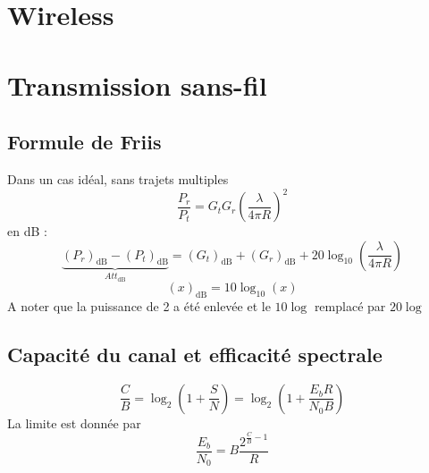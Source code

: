 \documentclass[resume]{subfiles}
\begin{document}
\section{Wireless}
\section{Transmission sans-fil}
\subsection{Formule de Friis}
Dans un cas idéal, sans trajets multiples
$$\frac{P_r}{P_t}=G_tG_r\left(\frac{\lambda}{4\pi R}\right)^2$$
en \si{\deci\bel} : 
$$\underbrace{(P_r)_{\si{\deci\bel}}-(P_t)_{\si{\deci\bel}}}_{Att_{\si{\deci\bel}}}=(G_t)_{\si{\deci\bel}}+(G_r)_{\si{\deci\bel}}+20\log_{10}\left(\frac{\lambda}{4\pi R}\right)$$
$$(x)_{\si{\deci\bel}}=10\log_{10}(x)$$
A noter que la puissance de 2 a été enlevée et le $10\log$ remplacé par $20\log$
\subsection{Capacité du canal et efficacité spectrale}
$$\frac{C}{B}=\log_2\left(1+\frac{S}{N}\right)=\log_2\left(1+\frac{E_bR}{N_0B}\right)$$
La limite est donnée par
$$\frac{E_b}{N_0}=B\frac{2^{\frac{C}{B}-1}}{R}$$
\end{document}
